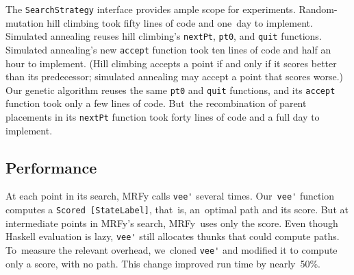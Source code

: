 \documentclass[nonatbib,preprint,blockstyle,times]{sigplanconf}
\newcommand\mrfy{MRFy} %
\newcommand\seclabel[1]{\label{sec:#1}}
\begin{document}
The \texttt{SearchStrategy} interface provides ample scope for
experiments.
Random-mutation hill climbing took fifty lines of code and one~day to
implement.
Simulated annealing reuses hill climbing's
 \texttt{nextPt}, \texttt{pt0}, and \texttt{quit} functions.
Simulated annealing's  new \texttt{accept} function took ten
lines of code and half an hour to implement.
(Hill climbing accepts a point if and only if it scores better than its
predecessor;
simulated annealing may accept a point that scores worse.)
Our genetic algorithm reuses the same
\texttt{pt0} and \texttt{quit} functions, and its \texttt{accept}
function took only a few lines of code.
But~the recombination of parent
placements in its \texttt{nextPt} function took forty lines of code
and a full day to implement.




\subsection{Performance}

\seclabel{perf}
\seclabel{performance}

At each point in its search,
MRFy calls \verb+vee'+ several
 times.
Our~\verb+vee'+
function computes a \mbox{\small \texttt{Scored [StateLabel]}}, that~is, 
an~optimal path and its score.
But at intermediate points in \mrfy's search,
\mrfy\ uses only the
score.
Even though Haskell evaluation is lazy, \verb+vee'+ 
still allocates thunks that could compute paths.
To~measure the relevant overhead,
we~cloned \verb+vee'+ and modified it to compute
only a score, with no path.
This change improved 
run time by nearly~50\%.
\end{document}
